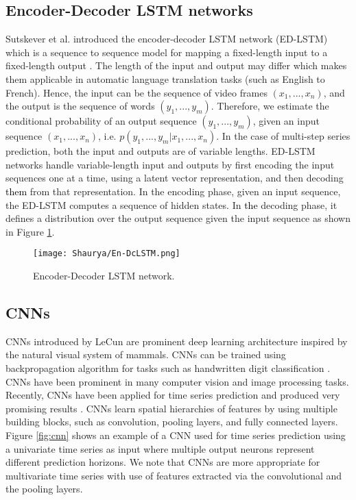 \documentclass{ieeeaccess}
\begin{document}
 \subsection{Encoder-Decoder LSTM networks} 
  
 
 Sutskever et al. \cite{NIPS2014_5346} introduced the encoder-decoder LSTM network (ED-LSTM) which is a sequence to sequence model for mapping a fixed-length input to a fixed-length output \cite{cho2014}. The length of the input and output may differ which makes them applicable in automatic language translation tasks (such as English to French). Hence,  the input can be  the sequence of video frames
$(x_1, . . . , x_n)$, and the output is the sequence of words
$(y_1, . . . , y_m)$. Therefore, we estimate the conditional probability of
an output sequence $(y_1, . . . , y_m)$, given an input sequence
$(x_1, . . . , x_n)$, i.e.
$p(y_1, . . . , y_m|x_1, . . . , x_n)$. In the case of multi-step series prediction,  both the input and outputs are of
variable lengths. ED-LSTM networks  handle variable-length input and outputs by  first encoding the input sequences one at a time,
 using a latent vector representation,
and then decoding \textcolor{black}{them} from that representation. 
In the encoding phase, given an input sequence, the ED-LSTM computes a sequence of hidden
states\textcolor{black}{.} In \textcolor{black}{the} decoding phase, it defines a distribution over the output sequence   given the input sequence  as shown in Figure \ref{fig:EN-DC LSTM}. 


 

\begin{figure}[htbp!]
  \begin{center}  
   \texttt{[image: Shaurya/En-DcLSTM.png]} 
    \caption{ Encoder-Decoder LSTM network. }
\label{fig:EN-DC LSTM}
  \end{center}
\end{figure}






\subsection{CNNs} 

 CNNs  introduced by LeCun \cite{lecun1990cnn,lecun1998cnn} are  prominent deep learning architecture inspired by the natural visual system of mammals. CNNs can be trained using backpropagation algorithm for tasks such as handwritten digit classification \cite{Hecht1989backprop}. CNNs have been prominent in many computer vision and image processing tasks. Recently, CNNs have been applied for time series prediction and produced very  promising results  \cite{Amarasinghe2017Deepelf,xingjian2015convolutional,wang2017deep}. CNNs   learn spatial hierarchies of features by using multiple building blocks, such as convolution, pooling layers, and fully connected layers.   Figure  \ref{fig:cnn} shows an example of a CNN used for time series prediction using a  univariate time series as input where multiple output neurons represent different prediction horizons. We note that CNNs are more appropriate for multivariate time series  with use of features extracted via the convolutional and the pooling layers. 
 
\end{document}
